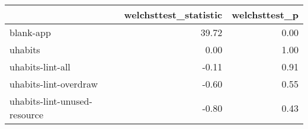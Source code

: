 \begin{tabular}{lrr}
\toprule
{} &  welchsttest\_statistic &  welchsttest\_p \\
\midrule
blank-app                    &                  39.72 &           0.00 \\
uhabits                      &                   0.00 &           1.00 \\
uhabits-lint-all             &                  -0.11 &           0.91 \\
uhabits-lint-overdraw        &                  -0.60 &           0.55 \\
uhabits-lint-unused-resource &                  -0.80 &           0.43 \\
\bottomrule
\end{tabular}
